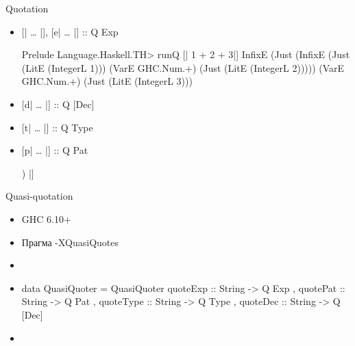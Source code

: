 \documentclass{beamer}
\begin{document}
\begin{frame}[fragile]{Quotation}
\begin{itemize}
    \item {[}| … |{]}, {[}e| … |{]} :: Q Exp
    \begin{haskellcode}
    [e| 1 + 2 + 3 |]

    Prelude Language.Haskell.TH> runQ [| 1 + 2 + 3|]
    InfixE (Just (InfixE (Just (LitE (IntegerL 1)))
    (VarE GHC.Num.+) (Just (LitE (IntegerL 2)))))
    (VarE GHC.Num.+) (Just (LitE (IntegerL 3)))
    \end{haskellcode}
    \item {[}d| … |{]} :: Q {[}Dec{]}
    \begin{haskellcode}
    [d| const a b = a |]
    \end{haskellcode}
    \item {[}t| … |{]} :: Q Type
    \begin{haskellcode}
    \end{haskellcode}
    \item {[}p| … |{]} :: Q Pat
    \begin{haskellcode}
    [p| (_, []) |]
    \end{haskellcode}
\end{itemize}
\end{frame}

\begin{frame}[fragile]{Quasi-quotation }
\begin{itemize}
    \item GHC 6.10+
    \item Прагма -XQuasiQuotes
    \item
    \begin{haskellcode}
    \end{haskellcode}
    \item
    \begin{haskellcode}
    data QuasiQuoter = QuasiQuoter
        { quoteExp  :: String -> Q Exp
        , quotePat  :: String -> Q Pat
        , quoteType :: String -> Q Type
        , quoteDec  :: String -> Q [Dec]
        }
    \end{haskellcode}
    \item
    \begin{haskellcode}
    \end{haskellcode}
\end{itemize}
\end{frame}
\end{document}
